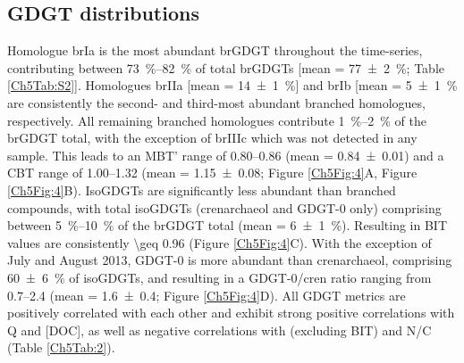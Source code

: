\subsection{GDGT distributions}

Homologue brIa is the most abundant brGDGT throughout the time-series, contributing between \SIrange{73}{82}{\%} of total brGDGTs [mean = \SI{77 \pm 2}{\%}; Table \ref{Ch5Tab:S2}]. Homologues brIIa [mean = \SI{14 \pm 1}{\%}] and brIb [mean = \SI{5 \pm 1}{\%} are consistently the second- and third-most abundant branched homologues, respectively. All remaining branched homologues contribute \SIrange{1}{2}{\%} of the brGDGT total, with the exception of brIIIc which was not detected in any sample. This leads to an MBT' range of \numrange{0.80}{0.86} (mean = \num{0.84 \pm 0.01}) and a CBT range of \numrange{1.00}{1.32} (mean = \num{1.15 \pm 0.08}; Figure \ref{Ch5Fig:4}A, Figure \ref{Ch5Fig:4}B). IsoGDGTs are significantly less abundant than branched compounds, with total isoGDGTs (crenarchaeol and GDGT-0 only) comprising between \SIrange{5}{10}{\%} of the brGDGT total (mean = \SI{6 \pm 1}{\%}). Resulting in BIT values are consistently \num{\geq 0.96} (Figure \ref{Ch5Fig:4}C). With the exception of July and August 2013, GDGT-0 is more abundant than crenarchaeol, comprising \SI{60 \pm 6}{\%} of isoGDGTs, and resulting in a GDGT-0/cren ratio ranging from \numrange{0.7}{2.4} (mean = \num{1.6 \pm 0.4}; Figure \ref{Ch5Fig:4}D). All GDGT metrics are positively correlated with each other and exhibit strong positive correlations with Q and [DOC], as well as negative correlations with  (excluding BIT) and N/C (Table \ref{Ch5Tab:2}).

